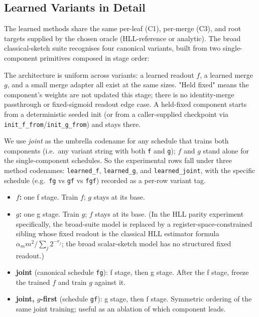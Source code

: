 \subsection{Learned Variants in Detail}\label{app:classical-parity-variants}

The learned methods share the same per-leaf (C1), per-merge (C3), and root
targets supplied by the chosen oracle (HLL-reference or analytic). The
broad classical-sketch suite recognises four canonical variants, built from
two single-component primitives composed in stage order:

The architecture is uniform across variants: a learned readout $f$, a
learned merge $g$, and a small merge adapter all exist at the same
sizes. "Held fixed" means the component's weights are not updated this
stage; there is no identity-merge passthrough or fixed-sigmoid readout
edge case. A held-fixed component starts from a deterministic seeded
init (or from a caller-supplied checkpoint via
\texttt{init\_f\_from}/\texttt{init\_g\_from}) and stays there.

We use \emph{joint} as the umbrella codename for any schedule that
trains both components (i.e.\ any variant string with both \texttt{f}
and \texttt{g}); $f$ and $g$ stand alone for the single-component
schedules. So the experimental rows fall under three method
codenames: \texttt{learned\_f}, \texttt{learned\_g}, and
\texttt{learned\_joint}, with the specific schedule (e.g.\ \texttt{fg}
vs \texttt{gf} vs \texttt{fgf}) recorded as a per-row variant tag.

\begin{itemize}
\item \textbf{$f$:} one f stage. Train $f$; $g$ stays at its base.
\item \textbf{$g$:} one g stage. Train $g$; $f$ stays at its base. (In
  the HLL parity experiment specifically, the broad-suite model is
  replaced by a register-space-constrained sibling whose fixed readout
  is the classical HLL estimator formula
  $\alpha_m m^2 / \sum_j 2^{-r_j}$; the broad scalar-sketch model has
  no structured fixed readout.)
\item \textbf{joint} (canonical schedule \texttt{fg}): f stage, then g
  stage. After the f stage, freeze the trained $f$ and train $g$
  against it.
\item \textbf{joint, $g$-first} (schedule \texttt{gf}): g stage, then
  f stage. Symmetric ordering of the same joint training; useful as an
  ablation of which component leads.
\end{itemize}

